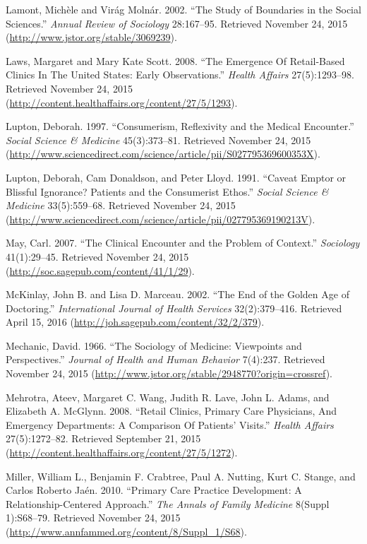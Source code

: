 \documentclass[12pt,twoside]{reedthesis}
\begin{document}
  Lamont, Mich{è}le and Vir{á}g Moln{á}r. 2002. ``The Study of Boundaries
  in the Social Sciences.'' \emph{Annual Review of Sociology} 28:167--95.
  Retrieved November 24, 2015 (\url{http://www.jstor.org/stable/3069239}).
  
  Laws, Margaret and Mary Kate Scott. 2008. ``The Emergence Of
  Retail-Based Clinics In The United States: Early Observations.''
  \emph{Health Affairs} 27(5):1293--98. Retrieved November 24, 2015
  (\url{http://content.healthaffairs.org/content/27/5/1293}).
  
  Lupton, Deborah. 1997. ``Consumerism, Reflexivity and the Medical
  Encounter.'' \emph{Social Science \& Medicine} 45(3):373--81. Retrieved
  November 24, 2015
  (\url{http://www.sciencedirect.com/science/article/pii/S027795369600353X}).
  
  Lupton, Deborah, Cam Donaldson, and Peter Lloyd. 1991. ``Caveat Emptor
  or Blissful Ignorance? Patients and the Consumerist Ethos.''
  \emph{Social Science \& Medicine} 33(5):559--68. Retrieved November 24,
  2015
  (\url{http://www.sciencedirect.com/science/article/pii/027795369190213V}).
  
  May, Carl. 2007. ``The Clinical Encounter and the Problem of Context.''
  \emph{Sociology} 41(1):29--45. Retrieved November 24, 2015
  (\url{http://soc.sagepub.com/content/41/1/29}).
  
  McKinlay, John B. and Lisa D. Marceau. 2002. ``The End of the Golden Age
  of Doctoring.'' \emph{International Journal of Health Services}
  32(2):379--416. Retrieved April 15, 2016
  (\url{http://joh.sagepub.com/content/32/2/379}).
  
  Mechanic, David. 1966. ``The Sociology of Medicine: Viewpoints and
  Perspectives.'' \emph{Journal of Health and Human Behavior} 7(4):237.
  Retrieved November 24, 2015
  (\url{http://www.jstor.org/stable/2948770?origin=crossref}).
  
  Mehrotra, Ateev, Margaret C. Wang, Judith R. Lave, John L. Adams, and
  Elizabeth A. McGlynn. 2008. ``Retail Clinics, Primary Care Physicians,
  And Emergency Departments: A Comparison Of Patients' Visits.''
  \emph{Health Affairs} 27(5):1272--82. Retrieved September 21, 2015
  (\url{http://content.healthaffairs.org/content/27/5/1272}).
  
  Miller, William L., Benjamin F. Crabtree, Paul A. Nutting, Kurt C.
  Stange, and Carlos Roberto Ja{é}n. 2010. ``Primary Care Practice
  Development: A Relationship-Centered Approach.'' \emph{The Annals of
  Family Medicine} 8(Suppl 1):S68--79. Retrieved November 24, 2015
  (\url{http://www.annfammed.org/content/8/Suppl_1/S68}).
  
\end{document}
